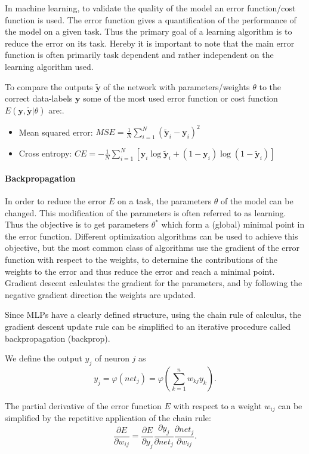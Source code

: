 In machine learning, to validate the quality of the model an error function/cost function is used.
The error function gives a quantification of the performance of the model on a given task.
Thus the primary goal of a learning algorithm is to reduce the error on its task.
Hereby it is important to note that the main error function is often primarily task dependent and rather independent on the learning algorithm used.  

To compare the outputs $\tilde{\textbf{y}}$ of the network with parameters/weights $\theta$ to the correct data-labels $\textbf{y}$ some of the most used error function or cost function $E(\textbf{y},\tilde{\textbf{y}} | \theta)$ are:.

\begin{itemize}
	\item Mean squared error: $MSE = \frac{1}{N} \sum_{i=1}^N (\tilde{\textbf{y}}_i - \textbf{y}_i)^2 $
	\item Cross entropy: $CE = - \frac{1}{N} \sum_{i=1}^N [ \textbf{y}_i \log \tilde{\textbf{y}}_i + (1 - \textbf{y}_i) \log (1 - \tilde{\textbf{y}}_i)]$
\end{itemize}

\paragraph{Backpropagation}

In order to reduce the error $E$ on a task, the parameters $\theta$ of the model can be changed.
This modification of the parameters is often referred to as learning.
Thus the objective is to get parameters $\theta^*$ which form a (global) minimal point in the error function. 
Different optimization algorithms can be used to achieve this objective, but the most common class of algorithms use the gradient of the error function with respect to the weights, to determine the contributions of the weights to the error and thus reduce the error and reach a minimal point.
Gradient descent calculates the gradient for the parameters, and by following the negative gradient direction the weights are updated.

Since MLPs have a clearly defined structure, using the chain rule of calculus, the gradient descent update rule can be simplified to an iterative procedure called backpropagation (backprop).

We define the output $y_j$ of neuron $j$ as
\[
	y_j = \varphi(net_j) = \varphi(\sum_{k=1}^n w_{kj} y_k) .
\]
 
The partial derivative of the error function $E$ with respect to a weight $w_{ij}$ can be simplified by the repetitive application of the chain rule:
\[
	\frac{\partial E}{\partial w_{ij}} = \frac{\partial E}{\partial y_j} \frac{\partial y_j}{\partial net_j} \frac{\partial net_j}{\partial w_{ij}} .
\]
 
